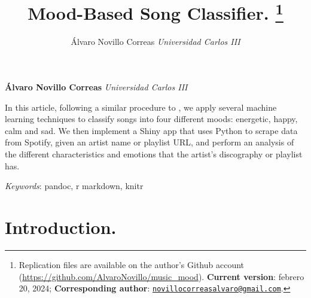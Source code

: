 \documentclass[11pt,]{article}
\title{Mood-Based Song Classifier. \thanks{Replication files are
available on the author's Github account
(\url{https://github.com/AlvaroNovillo/music_mood}). \textbf{Current
version}: febrero 20, 2024; \textbf{Corresponding author}:
\href{mailto:novillocorreasalvaro@gmail.com}{\nolinkurl{novillocorreasalvaro@gmail.com}}.}  }
\author{\Large Álvaro Novillo
Correas\vspace{0.05in} \newline\normalsize\emph{Universidad Carlos
III}  }
\date{}
\newcommand*{\authorfont}{\fontfamily{phv}\selectfont}
\renewenvironment{abstract}
 {{%
    \setlength{\leftmargin}{0mm}
    \setlength{\rightmargin}{\leftmargin}%
  }%
  \relax}
 {\endlist}
\begin{document}
%

{%
\setlength{\parindent}{0pt}
\thispagestyle{plain}
{\fontsize{18}{20}\selectfont\raggedright
\maketitle  %

}

{
   \vskip 13.5pt\relax \normalsize\fontsize{11}{12}
\textbf{\authorfont Álvaro Novillo
Correas} \hskip 15pt \emph{\small Universidad Carlos III}   

}

}








\begin{abstract}

    \hbox{\vrule height .2pt width 39.14pc}

    \vskip 8.5pt %

\noindent In this article, following a similar procedure to
\citep{data1}, we apply several machine learning techniques to classify
songs into four different moods: energetic, happy, calm and sad. We then
implement a Shiny app that uses Python to scrape data from Spotify,
given an artist name or playlist URL, and perform an analysis of the
different characteristics and emotions that the artist's discography or
playlist has.


\vskip 8.5pt \noindent \emph{Keywords}: pandoc, r markdown, knitr \par

    \hbox{\vrule height .2pt width 39.14pc}



\end{abstract}


\vskip -8.5pt



\noindent 

\hypertarget{introduction.}{%
\section{Introduction.}\label{introduction.}}
\end{document}
